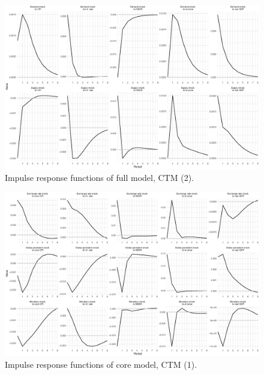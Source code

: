 \documentclass{beamer}
\begin{document}
\begin{frame}[noframenumbering]
	\begin{figure}[h!]
		\centering
		\includegraphics[width=1\linewidth]{../Text/figures/irf_2}
		\caption[]{Impulse response functions of full model, CTM (2).}
		\label{fig:irf_2}
	\end{figure}
\end{frame}

\begin{frame}[noframenumbering]
	\label{coreirfs}
	\begin{figure}[h!]
		\centering
		\includegraphics[width=1\linewidth]{../Text/figures/irf_core_1}
		\caption[]{Impulse response functions of core model, CTM (1).}
		\label{fig:irf_core_1}
	\end{figure}
 
\end{frame}
\end{document}
